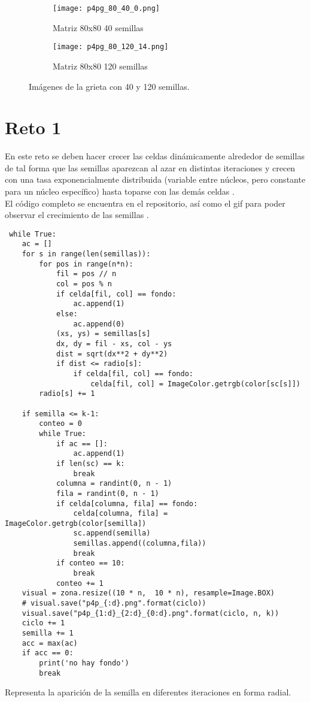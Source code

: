 \documentclass{article}
\begin{document}
\begin{figure}[H]
\centering
\begin{subfigure}[b]{0.30\linewidth}
\texttt{[image: p4pg\_80\_40\_0.png]}
\caption{Matriz 80x80 40 semillas}
\end{subfigure}
\begin{subfigure}[b]{0.30\linewidth}
\texttt{[image: p4pg\_80\_120\_14.png]}
\caption{Matriz 80x80 120 semillas}
\end{subfigure}
\caption{Imágenes de la grieta con 40 y 120 semillas.}
\label{fig:westminster}
\end{figure}

\newpage
\section{Reto 1}
En este reto se deben hacer crecer las celdas dinámicamente alrededor de semillas de tal forma que las semillas aparezcan al azar en distintas iteraciones y crecen con una tasa exponencialmente distribuida (variable entre núcleos, pero constante para un núcleo específico) hasta toparse con las demás celdas \cite{Satu_Elisa_Schaeffer}.\\
El código completo se encuentra en el repositorio, así como el gif para poder observar el crecimiento de las semillas \cite{Denisse_Leyva}.

\renewcommand{\listingscaption}{Código}
\begin{listing}[H]
  \begin{verbatim}
 while True:
    ac = []
    for s in range(len(semillas)):
        for pos in range(n*n):
            fil = pos // n
            col = pos % n
            if celda[fil, col] == fondo:
                ac.append(1)
            else:
                ac.append(0)
            (xs, ys) = semillas[s]
            dx, dy = fil - xs, col - ys
            dist = sqrt(dx**2 + dy**2)
            if dist <= radio[s]:
                if celda[fil, col] == fondo:
                    celda[fil, col] = ImageColor.getrgb(color[sc[s]])
        radio[s] += 1

    if semilla <= k-1:
        conteo = 0
        while True:
            if ac == []:
                ac.append(1)
            if len(sc) == k:
                break
            columna = randint(0, n - 1)
            fila = randint(0, n - 1)
            if celda[columna, fila] == fondo:
                celda[columna, fila] =  ImageColor.getrgb(color[semilla])
                sc.append(semilla)
                semillas.append((columna,fila))
                break
            if conteo == 10:
                break
            conteo += 1
    visual = zona.resize((10 * n,  10 * n), resample=Image.BOX)
    # visual.save("p4p_{:d}.png".format(ciclo))
    visual.save("p4p_{1:d}_{2:d}_{0:d}.png".format(ciclo, n, k))
    ciclo += 1
    semilla += 1
    acc = max(ac)
    if acc == 0:
        print('no hay fondo')
        break
  \end{verbatim}
  \label{lst:fibo}
  \caption{Representa la aparición de la semilla en diferentes iteraciones en forma radial.}
\end{listing}
\end{document}
